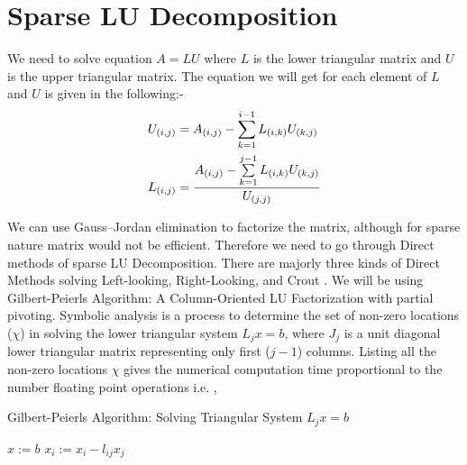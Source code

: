 \section{Sparse LU Decomposition}

We need to solve equation $A=LU$ where $L$ is the lower triangular matrix and $U$ is the upper triangular matrix. The equation we will get for each element of $L$ and $U$ is given in the following:-
\begin{subequations}
    \centering
    \begin{align}
        U_{(i,j)} & = A_{(i,j)} - \sum\limits_{k = 1}^{i-1} L_{(i,k)}U_{(k,j)} \label{eqn:LUD:LUequation0}\\
        L_{(i,j)} & = \frac{A_{(i,j)} - \sum\limits_{k = 1}^{j-1} L_{(i,k)}U_{(k,j)}}{U_{(j,j)}} \label{eqn:LUD:LUequation1}
    \end{align}
    \label{eqn:LUD:LUequation}
\end{subequations}


We can use Gauss–Jordan elimination to factorize the matrix, although for sparse nature matrix would not be efficient. Therefore we need to go through Direct methods of sparse LU Decomposition. There are majorly three kinds of Direct Methods solving Left-looking, Right-Looking, and Crout \cite{crout}. We will be using Gilbert-Peierls Algorithm: A Column-Oriented LU Factorization with partial pivoting.
Symbolic analysis is a process to determine the set of non-zero locations ($\chi$)
in solving the lower triangular system $L_j x = b$, where $J_j$ is a unit diagonal 
lower triangular matrix representing only first ($j-1$) columns. Listing all 
the non-zero locations \(\chi\) gives the numerical computation time proportional to
the number floating point operations i.e. ,


\begin{algorithm}[H]
    \caption{Gilbert-Peierls Algorithm: Solving Triangular System $L_j x = b$
        \label{algo:GP_tri}}
    \begin{algorithmic}[1]
        \Statex
        \State $x := b$
                \State $x_i := x_i - l_{ij} x_j$
            \EndFor
        \EndFor
    \end{algorithmic}
\end{algorithm}


